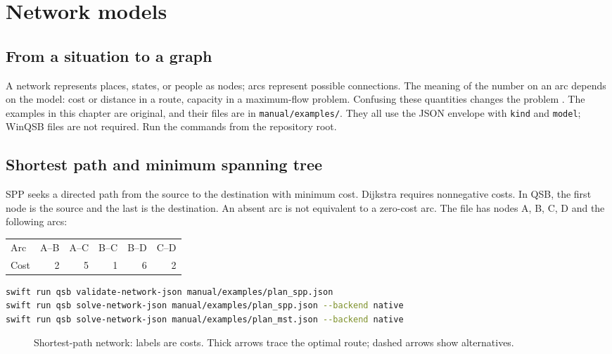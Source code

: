 \chapter{Network models}
\label{chap:redes}

\section{From a situation to a graph}
A network represents places, states, or people as nodes; arcs represent
possible connections. The meaning of the number on an arc depends on the
model: cost or distance in a route, capacity in a maximum-flow problem.
Confusing these quantities changes the problem \cite{ahuja1993network}.
The examples in this chapter are original, and their files are in
\texttt{manual/examples/}. They all use the JSON envelope with \texttt{kind}
and \texttt{model}; WinQSB files are not required.
Run the commands from the repository root.

\section{Shortest path and minimum spanning tree}
SPP seeks a directed path from the source to the destination with minimum cost.
Dijkstra requires nonnegative costs. In QSB, the first node is the source and
the last is the destination. An absent arc is not equivalent to a zero-cost arc.
The file  has nodes A, B, C, D and the following arcs:
\begin{center}
\begin{tabular}{lrrrrr}\toprule
Arc & A--B & A--C & B--C & B--D & C--D \\
Cost & 2 & 5 & 1 & 6 & 2 \\
\bottomrule\end{tabular}
\end{center}
\begin{lstlisting}[language=bash]
swift run qsb validate-network-json manual/examples/plan_spp.json
swift run qsb solve-network-json manual/examples/plan_spp.json --backend native
swift run qsb solve-network-json manual/examples/plan_mst.json --backend native
\end{lstlisting}
\begin{figure}[htbp]
\centering

\caption{Shortest-path network: labels are costs. Thick arrows trace the optimal route; dashed arrows show alternatives.}
\label{fig:shortest-path}
\end{figure}

